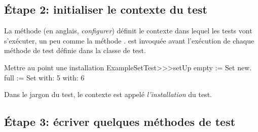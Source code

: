 \documentclass[a4paper,10pt,twoside]{book}
\begin{document}
\subsection{\'Etape 2: initialiser le contexte du test}

La méthode  (en anglais, \emph{configurer}) définit le contexte dans lequel les tests vont s'exécuter, un peu comme la méthode .  est invoquée avant l'exécution de chaque méthode de test définie dans la classe de test.

% 

\begin{method}[setupExampleSetTest]{Mettre au point une installation}
ExampleSetTest>>>setUp
	empty := Set new.
	full := Set with: 5 with: 6
\end{method}

\noindent
Dans le jargon du test, le contexte est appelé \emph{l'installation} du test.

\subsection{\'Etape 3: écriver quelques méthodes de test}
\end{document}
